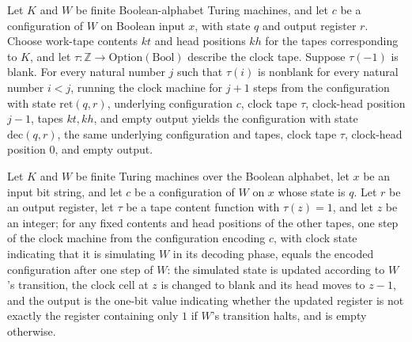 \begin{lemma}
\label{Complexity.TimeHierarchy.ret_run}
\leanok
{}
Let $K$ and $W$ be finite Boolean-alphabet Turing machines, and let $c$ be a
configuration of $W$ on Boolean input $x$, with state $q$ and output register $r$.
Choose work-tape contents $kt$ and head positions $kh$ for the tapes corresponding to
$K$, and let $\tau:\mathbb Z\to\mathrm{Option}(\mathrm{Bool})$ describe the clock tape.
Suppose $\tau(-1)$ is blank. For every natural number $j$ such that $\tau(i)$ is
nonblank for every natural number $i<j$, running the clock machine for $j+1$ steps from
the configuration with state $\mathrm{ret}(q,r)$, underlying configuration $c$, clock
tape $\tau$, clock-head position $j-1$, tapes $kt,kh$, and empty output yields the
configuration with state $\mathrm{dec}(q,r)$, the same underlying configuration and
tapes, clock tape $\tau$, clock-head position $0$, and empty output.
\end{lemma}

\begin{lemma}
\label{Complexity.TimeHierarchy.wstep}
\leanok
{}
Let $K$ and $W$ be finite Turing machines over the Boolean alphabet, let $x$ be an input
bit string, and let $c$ be a configuration of $W$ on $x$ whose state is $q$. Let $r$ be
an output register, let $\tau$ be a tape content function with $\tau(z)=1$, and let $z$
be an integer; for any fixed contents and head positions of the other tapes, one step of
the clock machine from the configuration encoding $c$, with clock state indicating that
it is simulating $W$ in its decoding phase, equals the encoded configuration after one
step of $W$: the simulated state is updated according to $W$'s transition, the clock
cell at $z$ is changed to blank and its head moves to $z-1$, and the output is the
one-bit value indicating whether the updated register is not exactly the register
containing only $1$ if $W$'s transition halts, and is empty otherwise.
\end{lemma}


